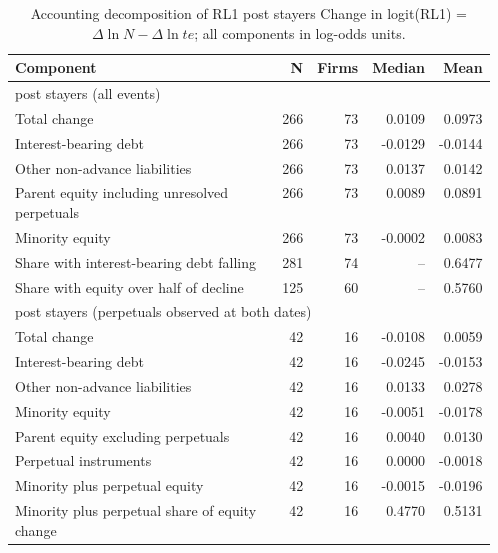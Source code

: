 \begin{table}[!htbp]\centering\scriptsize
\caption{Accounting decomposition of RL1 post stayers Change in logit(RL1) = $\Delta\ln N - \Delta\ln te$; all components in log-odds units.}
\begin{threeparttable}
\begin{tabular}{p{0.56\linewidth}rrrr}
\toprule
Component & N & Firms & Median & Mean \\
\midrule
\multicolumn{5}{l}{post stayers (all events)} \\
Total change & 266 & 73 & 0.0109 & 0.0973 \\
Interest-bearing debt & 266 & 73 & -0.0129 & -0.0144 \\
Other non-advance liabilities & 266 & 73 & 0.0137 & 0.0142 \\
Parent equity including unresolved perpetuals & 266 & 73 & 0.0089 & 0.0891 \\
Minority equity & 266 & 73 & -0.0002 & 0.0083 \\
Share with interest-bearing debt falling & 281 & 74 & -- & 0.6477 \\
Share with equity over half of decline & 125 & 60 & -- & 0.5760 \\
\multicolumn{5}{l}{post stayers (perpetuals observed at both dates)} \\
Total change & 42 & 16 & -0.0108 & 0.0059 \\
Interest-bearing debt & 42 & 16 & -0.0245 & -0.0153 \\
Other non-advance liabilities & 42 & 16 & 0.0133 & 0.0278 \\
Minority equity & 42 & 16 & -0.0051 & -0.0178 \\
Parent equity excluding perpetuals & 42 & 16 & 0.0040 & 0.0130 \\
Perpetual instruments & 42 & 16 & 0.0000 & -0.0018 \\
Minority plus perpetual equity & 42 & 16 & -0.0015 & -0.0196 \\
Minority plus perpetual share of equity change & 42 & 16 & 0.4770 & 0.5131 \\
\bottomrule
\end{tabular}
\begin{tablenotes}[flushleft]\footnotesize

\end{tablenotes}
\end{threeparttable}
\end{table}

